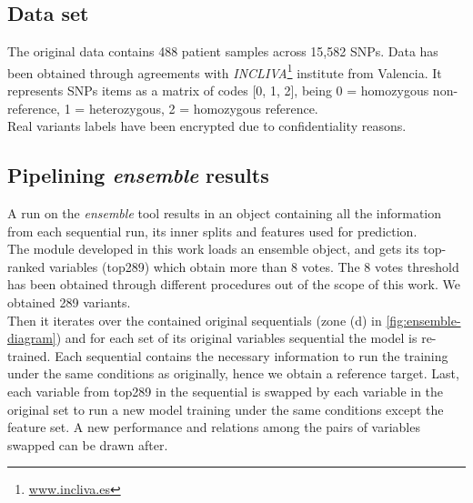 \subsection{Data set}
The original data contains 488 patient samples across 15,582 SNPs. Data has been obtained through agreements with \emph{INCLIVA}\footnote{\url{www.incliva.es}} institute from Valencia. It represents SNPs items as a matrix of codes [0, 1, 2], being 0 = homozygous non-reference, 1 = heterozygous, 2 = homozygous reference. 
\\

Real variants labels have been encrypted due to confidentiality reasons.

\subsection{Pipelining \emph{ensemble} results}
\label{section:methods:pipeline}
A run on the \emph{ensemble} tool results in an object containing all the information from each sequential run, its inner splits and features used for prediction.
\\

The module developed in this work loads an ensemble object, and gets its top-ranked variables (top289) which obtain more than 8 votes. The 8 votes threshold has been obtained through different procedures out of the scope of this work. We obtained 289 variants.
\\

Then it iterates over the contained original sequentials (zone (d) in \ref{fig:ensemble-diagram}) and for each set of its original variables sequential the model is re-trained. Each sequential contains the necessary information to run the training under the same conditions as originally, hence we obtain a reference target. Last, each variable from top289 in the sequential is swapped by each variable in the original set to run a new model training under the same conditions except the feature set.
A new performance and relations among the pairs of variables swapped can be drawn after.
\\

